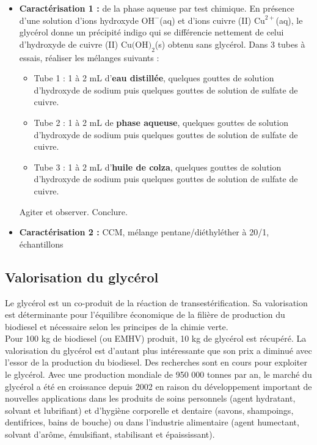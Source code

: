 \documentclass[11pt,a4paper]{report}
\begin{document}
	\begin{itemize}
		\item \textbf{Caractérisation 1 :} de la phase aqueuse par test chimique. En présence d'une 			solution d'ions hydroxyde $\text{OH}^-$(aq) et d'ions cuivre (II) $\text{Cu}^{2+}$(aq), le 				glycérol donne un précipité indigo qui se différencie nettement de celui d'hydroxyde de 
		cuivre (II) $\text{Cu(OH)}_2$(s) obtenu sans glycérol. Dans 3 tubes à essais, réaliser les 				mélanges suivants :
		\begin{itemize}
			\item Tube 1 : 1 à 2 mL d'\textbf{eau distillée}, quelques gouttes de solution d'hydroxyde 					de sodium puis quelques gouttes de solution de sulfate de cuivre.
			\item Tube 2 : 1 à 2 mL de \textbf{phase aqueuse}, quelques gouttes de solution d'hydroxyde 				de sodium puis quelques gouttes de solution de sulfate de cuivre.
			\item Tube 3 : 1 à 2 mL d'\textbf{huile de colza}, quelques gouttes de solution d'hydroxyde 				de sodium puis quelques gouttes de solution de sulfate de cuivre.
		\end{itemize}
		Agiter et observer. Conclure.\\
		
		\item \textbf{Caractérisation 2 :} CCM, mélange pentane/diéthyléther à 20/1, échantillons
	\end{itemize}
	
\subsection{Valorisation du glycérol}

Le glycérol est un co-produit de la réaction de transestérification. Sa valorisation est déterminante pour l'équilibre économique de la filière de production du biodiesel et nécessaire selon les principes de la chimie verte.\\ 

Pour 100 kg de biodiesel (ou EMHV) produit, 10 kg de glycérol est récupéré. La valorisation du
glycérol est d’autant plus intéressante que son prix a diminué avec l'essor de la production du
biodiesel. Des recherches sont en cours pour exploiter le glycérol. Avec une production mondiale de 950 000 tonnes par an, le marché du glycérol a été en croissance depuis 2002 en raison du développement important de nouvelles applications dans les produits de soins personnels (agent hydratant, solvant et lubrifiant) et d'hygiène corporelle et dentaire (savons, shampoings, dentifrices, bains de bouche) ou dans l'industrie alimentaire (agent humectant, solvant d'arôme, émulsifiant, stabilisant et épaississant).
\end{document}
